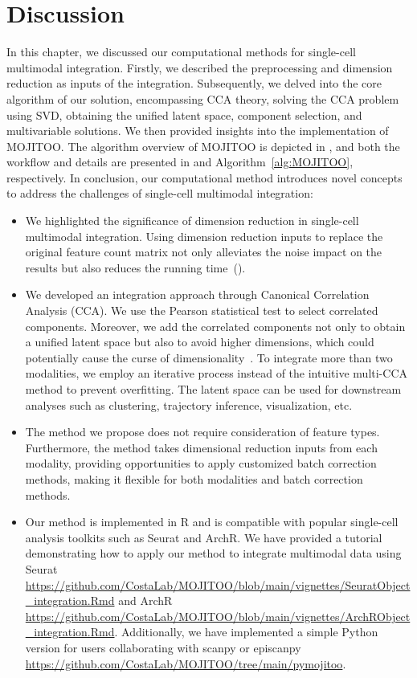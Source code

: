 \section{Discussion}
\label{inte_methods:discussion}
In this chapter, we discussed our computational methods for single-cell multimodal integration. Firstly, we described the preprocessing and dimension reduction as inputs of the integration. Subsequently, we delved into the core algorithm of our solution, encompassing CCA theory, solving the CCA problem using SVD, obtaining the unified latent space, component selection, and multivariable solutions. We then provided insights into the implementation of MOJITOO. The algorithm overview of MOJITOO is depicted in , and both the workflow and details are presented in  and Algorithm~\ref{alg:MOJITOO}, respectively. In conclusion, our computational method introduces novel concepts to address the challenges of single-cell multimodal integration:
\begin{itemize}

    \item We highlighted the significance of dimension reduction in single-cell multimodal integration. Using dimension reduction inputs to replace the original feature count matrix not only alleviates the noise impact on the results but also reduces the running time~().

    \item We developed an integration approach through Canonical Correlation Analysis (CCA). We use the Pearson statistical test to select correlated components. Moreover, we add the correlated components not only to obtain a unified latent space but also to avoid higher dimensions, which could potentially cause the curse of dimensionality~\citep{Dreyfus2003}. To integrate more than two modalities, we employ an iterative process instead of the intuitive multi-CCA method to prevent overfitting. The latent space can be used for downstream analyses such as clustering, trajectory inference, visualization, etc.


    \item The method we propose does not require consideration of feature types. Furthermore, the method takes dimensional reduction inputs from each modality, providing opportunities to apply customized batch correction methods, making it flexible for both modalities and batch correction methods.

    \item Our method is implemented in R and is compatible with popular single-cell analysis toolkits such as Seurat and ArchR. We have provided a tutorial demonstrating how to apply our method to integrate multimodal data using Seurat \url{https://github.com/CostaLab/MOJITOO/blob/main/vignettes/SeuratObject_integration.Rmd} and ArchR \url{https://github.com/CostaLab/MOJITOO/blob/main/vignettes/ArchRObject_integration.Rmd}. Additionally, we have implemented a simple Python version for users collaborating with scanpy or episcanpy \url{https://github.com/CostaLab/MOJITOO/tree/main/pymojitoo}.
\end{itemize}

